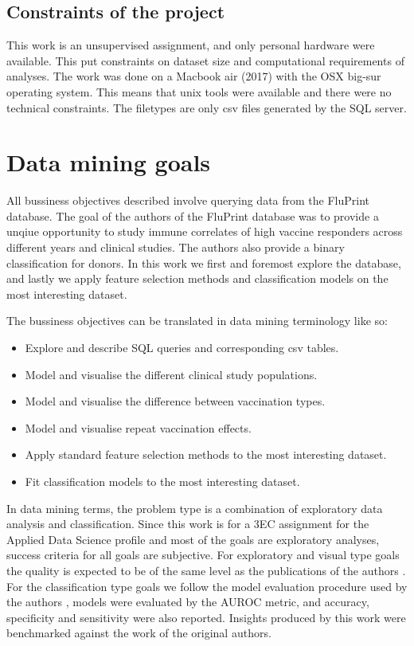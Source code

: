 \subsection{Constraints of the project}

This work is an unsupervised assignment, and only personal hardware were
available. This put constraints on dataset size and computational requirements
of analyses. The work was done on a Macbook air (2017) with the OSX big-sur
operating system. This means that unix tools were available and there were no
technical constraints. The filetypes are only csv files generated by the SQL
server.

\section{Data mining goals}

All bussiness objectives described involve querying data from the FluPrint
database. The goal of the authors of the FluPrint database was to provide a
unqiue opportunity to study immune correlates of high vaccine responders across
different years and clinical studies. The authors also provide a binary
classification for donors. In this work we first and foremost explore the
database, and lastly we apply feature selection methods and classification
models on the most interesting dataset.

The bussiness objectives can be translated in data mining terminology like so:
\begin{itemize}
        \item Explore and describe SQL queries and corresponding csv tables.
        \item Model and visualise the different clinical study populations.
        \item Model and visualise the difference between vaccination types.
        \item Model and visualise repeat vaccination effects.
        \item Apply standard feature selection methods to the most interesting dataset.
        \item Fit classification models to the most interesting dataset.
\end{itemize}

In data mining terms, the problem type is a combination of exploratory data
analysis and classification. Since this work is for a 3EC assignment for the
Applied Data Science profile and most of the goals are exploratory analyses,
success criteria for all goals are subjective. For exploratory and visual type
goals the quality is expected to be of the same level as the publications of
the authors \cite{tomicFluPRINTDatasetMultidimensional2019,
tomicSIMONAutomatedMachine2019}.  For the classification type goals we follow
the model evaluation procedure used by the authors
\cite{tomicSIMONAutomatedMachine2019}, models were evaluated by the AUROC
metric, and accuracy, specificity and sensitivity were also reported. Insights
produced by this work were benchmarked against the work of the original
authors.

